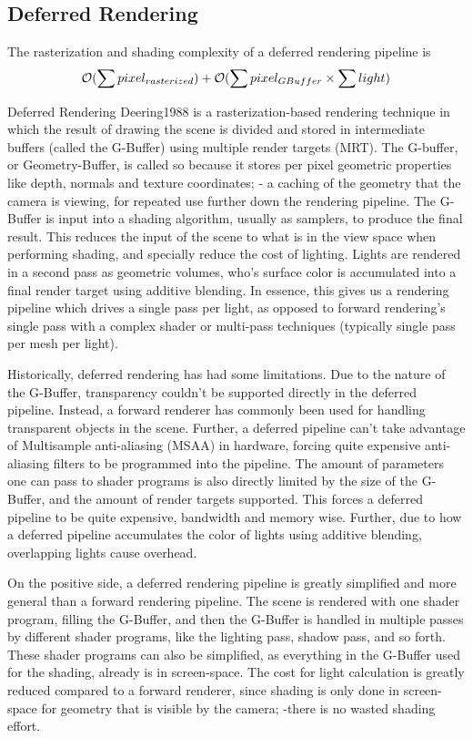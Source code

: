 \subsection{Deferred Rendering}

The rasterization and shading complexity of a deferred rendering pipeline is
\begin{equation}\label{eq:DRP_complexity}
		\mathcal{O}(\sum {pixel_{rasterized}}) + \mathcal{O}(\sum {pixel_{GBuffer}} \times \sum {light})
\end{equation}

Deferred Rendering Deering1988 is a rasterization-based rendering technique in which the result of drawing the scene is divided and stored in intermediate buffers (called the G-Buffer) using multiple render targets (MRT).  The G-buffer, or Geometry-Buffer, is called so because it stores per pixel geometric properties like depth, normals and texture coordinates; - a caching of the geometry that the camera is viewing, for repeated use further down the rendering pipeline. The G-Buffer is input into a shading algorithm, usually as samplers, to produce the final result. This reduces the input of the scene to what is in the view space when performing shading, and specially reduce the cost of lighting. Lights are rendered in a second pass as geometric volumes, who's surface color is accumulated into a final render target using additive blending. In essence, this gives us a rendering pipeline which drives a single pass per light, as opposed to forward rendering's single pass with a complex shader or multi-pass techniques (typically single pass per mesh per light).

Historically, deferred rendering has had some limitations. Due to the nature of the G-Buffer, transparency couldn't be supported directly in the deferred pipeline. Instead, a forward renderer has commonly been used for handling transparent objects in the scene. Further, a deferred pipeline can't take advantage of Multisample anti-aliasing (MSAA) in hardware, forcing quite expensive anti-aliasing filters to be programmed into the pipeline. The amount of parameters one can pass to shader programs is also directly limited by the size of the G-Buffer, and the amount of render targets supported. This forces a deferred pipeline to be quite expensive, bandwidth and memory wise. Further, due to how a deferred pipeline accumulates the color of lights using additive blending, overlapping lights cause overhead.

On the positive side, a deferred rendering pipeline is greatly simplified and more general than a forward rendering pipeline. The scene is rendered with one shader program, filling the G-Buffer, and then the G-Buffer is handled in multiple passes by different shader programs, like the lighting pass, shadow pass, and so forth. These shader programs can also be simplified, as everything in the G-Buffer used for the shading, already is in screen-space. The cost for light calculation is greatly reduced compared to a forward renderer, since shading is only done in screen-space for geometry that is visible by the camera; -there is no wasted shading effort.

